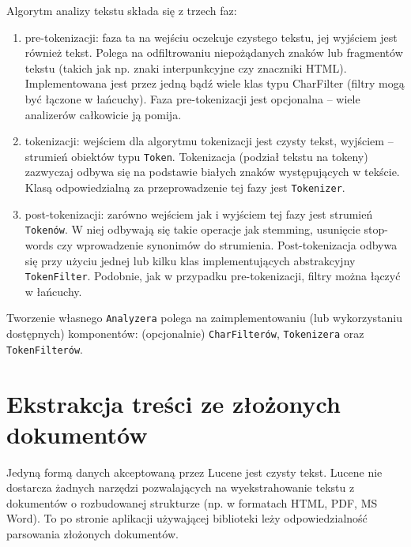 Algorytm analizy tekstu składa się z trzech faz:
\begin{enumerate}
 \item pre-tokenizacji: faza ta na wejściu oczekuje czystego tekstu, jej wyjściem jest również tekst. Polega na odfiltrowaniu niepożądanych znaków lub fragmentów tekstu (takich jak np. znaki interpunkcyjne czy znaczniki HTML). Implementowana jest przez jedną bądź wiele klas typu CharFilter (filtry mogą być łączone w łańcuchy). Faza pre-tokenizacji jest opcjonalna -- wiele analizerów całkowicie ją pomija.
 \item tokenizacji: wejściem dla algorytmu tokenizacji jest czysty tekst, wyjściem -- strumień obiektów typu \texttt{Token}. Tokenizacja (podział tekstu na tokeny) zazwyczaj odbywa się na podstawie białych znaków występujących w tekście. Klasą odpowiedzialną za przeprowadzenie tej fazy jest \texttt{Tokenizer}.
 \item post-tokenizacji: zarówno wejściem jak i wyjściem tej fazy jest strumień \texttt{Tokenów}. W niej odbywają się takie operacje jak stemming, usunięcie stop-words czy wprowadzenie synonimów do strumienia. Post-tokenizacja odbywa się przy użyciu  jednej lub kilku klas implementujących abstrakcyjny \texttt{TokenFilter}. Podobnie, jak w przypadku pre-tokenizacji, filtry można łączyć w łańcuchy.
\end{enumerate}

Tworzenie własnego \texttt{Analyzera} polega na zaimplementowaniu (lub wykorzystaniu dostępnych) komponentów: (opcjonalnie) \texttt{CharFilterów}, \texttt{Tokenizera} oraz \texttt{TokenFilterów}. 

\section{Ekstrakcja treści ze złożonych dokumentów}

Jedyną formą danych akceptowaną przez Lucene jest czysty tekst. Lucene nie dostarcza żadnych narzędzi pozwalających na wyekstrahowanie tekstu z dokumentów o rozbudowanej strukturze (np. w formatach HTML, PDF, MS Word). To po stronie aplikacji używającej biblioteki leży odpowiedzialność parsowania złożonych dokumentów. 